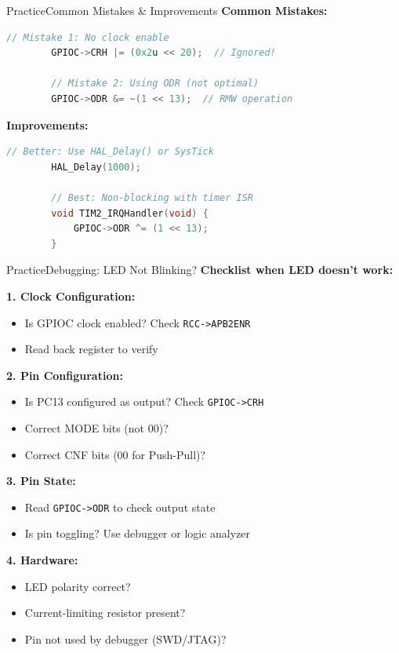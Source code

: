 \documentclass{beamer}
\begin{document}
\begin{frame}[fragile]{Practice}{Common Mistakes \& Improvements}
	\textbf{Common Mistakes:}
	\begin{lstlisting}[language=C, basicstyle=\ttfamily\footnotesize]
		// Mistake 1: No clock enable
		GPIOC->CRH |= (0x2u << 20);  // Ignored!
		
		// Mistake 2: Using ODR (not optimal)
		GPIOC->ODR &= ~(1 << 13);  // RMW operation
	\end{lstlisting}
	
	\textbf{Improvements:}
	\begin{lstlisting}[language=C, basicstyle=\ttfamily\footnotesize]
		// Better: Use HAL_Delay() or SysTick
		HAL_Delay(1000);
		
		// Best: Non-blocking with timer ISR
		void TIM2_IRQHandler(void) {
			GPIOC->ODR ^= (1 << 13);
		}
	\end{lstlisting}
\end{frame}
\begin{frame}{Practice}{Debugging: LED Not Blinking?}
	\textbf{Checklist when LED doesn't work:}
	
	\medskip
	\textbf{1. Clock Configuration:}
	\begin{itemize}
		\item Is GPIOC clock enabled? Check \texttt{RCC->APB2ENR}
		\item Read back register to verify
	\end{itemize}
	
	\textbf{2. Pin Configuration:}
	\begin{itemize}
		\item Is PC13 configured as output? Check \texttt{GPIOC->CRH}
		\item Correct MODE bits (not 00)?
		\item Correct CNF bits (00 for Push-Pull)?
	\end{itemize}
	
	\textbf{3. Pin State:}
	\begin{itemize}
		\item Read \texttt{GPIOC->ODR} to check output state
		\item Is pin toggling? Use debugger or logic analyzer
	\end{itemize}
	
	\textbf{4. Hardware:}
	\begin{itemize}
		\item LED polarity correct?
		\item Current-limiting resistor present?
		\item Pin not used by debugger (SWD/JTAG)?
	\end{itemize}
\end{frame}
\end{document}
